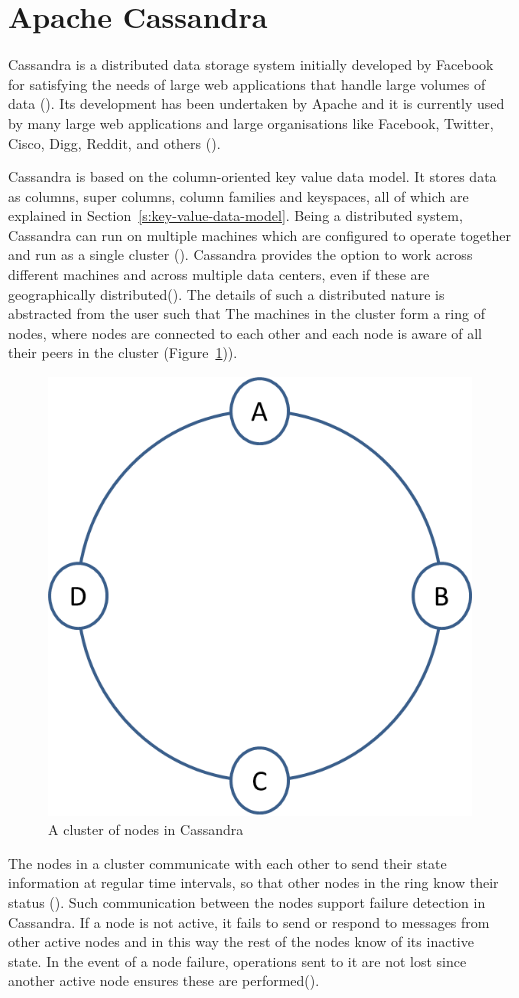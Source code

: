 \section{Apache Cassandra} \label{s:Background-Cassandra}

Cassandra is a distributed data storage system initially developed by Facebook
for satisfying the needs of large web applications that handle large
volumes of data (). 
Its development has been undertaken by Apache  and it is  currently used by
many large web applications and large organisations like Facebook,  Twitter, 
Cisco,  Digg,  Reddit, and others (). 

Cassandra is based on the column-oriented key value data model. It stores data
as columns,  super columns,  column families and keyspaces, all of which are
explained in Section~\ref{s:key-value-data-model}. Being a distributed
system, Cassandra can run on multiple machines which are
configured to operate together and run as a single cluster  ().
Cassandra provides the option  to work across different machines and across
multiple data centers,  even if these  are geographically distributed().  The details of such a distributed nature is abstracted from  the user
such that 
The machines in the cluster form a ring of nodes,  where
nodes are connected to each other and each node is aware of all their peers in
the cluster (Figure~\ref{f:cassandra-cluster})).


\begin{figure}[h] \centering 
\includegraphics[width=.3\textwidth]{./figure/Background/CassandraCluster.png}
	\caption{A cluster of nodes in Cassandra}\label{f:cassandra-cluster}
\end{figure}

The nodes in a cluster communicate with each other to send their state
information at regular time intervals,  so that other nodes in the ring  know
their status (). Such communication between the nodes
support failure detection in Cassandra.
If a node is not active,  it fails to send or respond to messages from other
active nodes and in this way the rest of the nodes  know of its inactive state.
In the event of a node failure,
operations sent to it are not lost since another active node ensures these are
performed().

